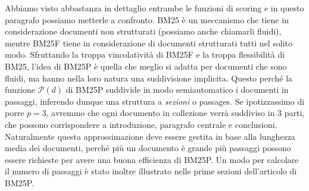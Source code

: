  Abbiamo visto abbastanza in dettaglio entrambe le funzioni di scoring e in questo paragrafo possiamo metterle a confronto.
 BM25 è un meccanismo che tiene in considerazione documenti non strutturati (possiamo anche chiamarli fluidi),
 mentre BM25F tiene in considerazione di documenti strutturati tutti nel solito modo.
 Sfruttando la troppa vincolatività di BM25F e la troppa flessibilità di BM25, l'idea di BM25P è quella che meglio
 si adatta per documenti che sono fluidi, ma hanno nella loro natura una suddivisione implicita.
Questo perché la funzione $\mathcal{P}(d)$ di  BM25P suddivide in modo semiautomatico
 i documenti in passaggi, inferendo dunque una struttura a \textit{sezioni} o passages.
 Se ipotizzassimo di porre $p=3$,
 avremmo che ogni documento in collezione verrà suddiviso in 3 parti, che possono corrispondere
 a introduzione, paragrafo centrale e conclusioni. Naturalmente questa approssimazione deve essere
 gestita in base alla lunghezza media dei documenti, perché più un documento è grande più passaggi possono
 essere richieste per avere una buona efficienza di BM25P. Un modo per calcolare il numero di passaggi è
 stato inoltre illustrato nelle prime sezioni dell'articolo di BM25P\cite{10.1145/3331184.3331373}.
 